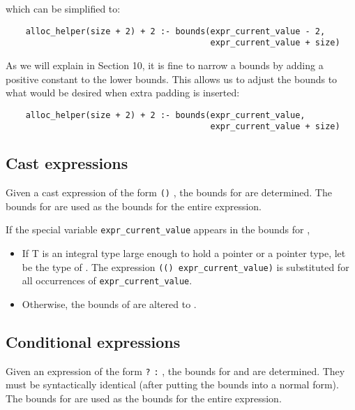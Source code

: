 which can be simplified to:

\begin{verbatim}
    alloc_helper(size + 2) + 2 :- bounds(expr_current_value - 2, 
                                         expr_current_value + size)
\end{verbatim}

As we will explain in Section 10, it is fine to narrow a bounds by
adding a positive constant to the lower bounds. This allows us to adjust
the bounds to what would be desired when extra padding is inserted:

\begin{verbatim}
    alloc_helper(size + 2) + 2 :- bounds(expr_current_value, 
                                         expr_current_value + size)
\end{verbatim}

\subsection{Cast expressions}\label{cast-expressions}

Given a cast expression of the form \texttt{()} ,
the bounds for  are determined. The bounds for
 are used as the bounds for the entire expression.

If the special variable \texttt{expr\_current\_value} appears in the
bounds for ,

\begin{itemize}
\item
  If T is an integral type large enough to hold a pointer or a pointer
  type, let  be the type of . The expression
  \texttt{(() expr\_current\_value)} is substituted for
  all occurrences of \texttt{expr\_current\_value}.
\item
  Otherwise, the bounds of  are  altered to \boundsnone.
\end{itemize}
  
\subsection{Conditional expressions}\label{conditional-expressions}

Given an expression of the form  \texttt{?} 
\texttt{:} , the bounds for  and  are
determined. They must be syntactically identical (after putting the
bounds into a normal form). The bounds for  are used as the
bounds for the entire expression.


